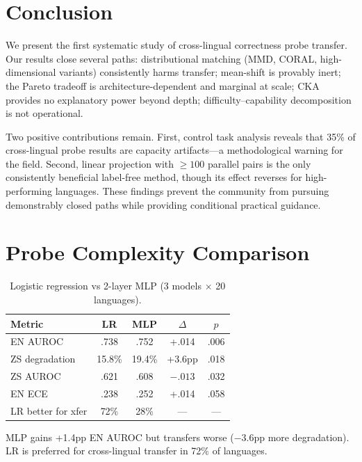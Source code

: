 \documentclass[11pt,a4paper]{article}
\begin{document}
\section{Conclusion}
\label{sec:conclusion}

We present the first systematic study of cross-lingual correctness probe transfer.
Our results close several paths:
distributional matching (MMD, CORAL, high-dimensional variants) consistently harms transfer;
mean-shift is provably inert;
the Pareto tradeoff is architecture-dependent and marginal at scale;
CKA provides no explanatory power beyond depth;
difficulty--capability decomposition is not operational.

Two positive contributions remain.
First, control task analysis reveals that 35\% of cross-lingual probe results are capacity artifacts---a methodological warning for the field.
Second, linear projection with ${\geq}100$ parallel pairs is the only consistently beneficial label-free method, though its effect reverses for high-performing languages.
These findings prevent the community from pursuing demonstrably closed paths while providing conditional practical guidance.

\appendix

\section{Probe Complexity Comparison}
\label{app:probe}

\begin{table}[h]
\centering
\small
\caption{Logistic regression vs 2-layer MLP (3 models $\times$ 20 languages).}
\label{tab:probecmp}
\begin{tabular}{lcccc}
\toprule
Metric & LR & MLP & $\Delta$ & $p$ \\
\midrule
EN AUROC & .738 & .752 & +.014 & .006 \\
ZS degradation & 15.8\% & 19.4\% & +3.6pp & .018 \\
ZS AUROC & .621 & .608 & $-.013$ & .032 \\
EN ECE & .238 & .252 & +.014 & .058 \\
LR better for xfer & 72\% & 28\% & --- & --- \\
\bottomrule
\end{tabular}
\end{table}

MLP gains +1.4pp EN AUROC but transfers worse ($-$3.6pp more degradation).
LR is preferred for cross-lingual transfer in 72\% of languages.
\end{document}
